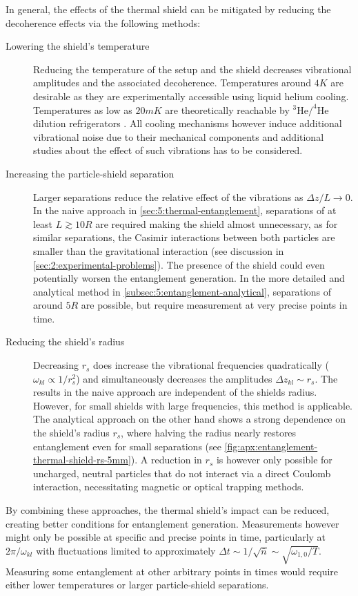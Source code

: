 In general, the effects of the thermal shield can be mitigated by reducing the decoherence effects via the following methods:
\begin{description}
  \item[Lowering the shield's temperature] Reducing the temperature of the setup and the shield decreases vibrational amplitudes and the associated decoherence.
  Temperatures around $4\si{K}$ are desirable as they are experimentally accessible using liquid helium cooling. Temperatures as low as $20\si{mK}$ are theoretically reachable by $^3\mathrm{He}/^4\mathrm{He}$ dilution refrigerators \cite{Das_1965, Zu_2022}. All cooling mechanisms however induce additional vibrational noise due to their mechanical components and additional studies about the effect of such vibrations has to be considered.

  \item[Increasing the particle-shield separation] Larger separations reduce the relative effect of the vibrations as $\Delta z / L \rightarrow 0$. In the naive approach in \cref{sec:5:thermal-entanglement}, separations of at least $L \gtrsim 10 R$ are required making the shield almost unnecessary, as for similar separations, the Casimir interactions between both particles are smaller than the gravitational interaction (see discussion in \cref{sec:2:experimental-problems}). The presence of the shield could even potentially worsen the entanglement generation. In the more detailed and analytical method in \cref{subsec:5:entanglement-analytical}, separations of around $5R$ are possible, but require measurement at very precise points in time.
  
  \item[Reducing the shield's radius] Decreasing $r_s$ does increase the vibrational frequencies quadratically ($\omega_{kl} \propto 1/r_s^2$) and simultaneously decreases the amplitudes $\Delta z_{kl} \sim r_s$. The results in the naive approach are independent of the shields radius. However, for small shields with large frequencies, this method is applicable. The analytical approach on the other hand shows a strong dependence on the shield's radius $r_s$, where halving the radius nearly restores entanglement even for small separations (see \cref{fig:apx:entanglement-thermal-shield-rs-5mm}). A reduction in $r_s$ is however only possible for uncharged, neutral particles that do not interact via a direct Coulomb interaction, necessitating magnetic or optical trapping methods.
\end{description}
By combining these approaches, the thermal shield's impact can be reduced, creating better conditions for entanglement generation. Measurements however might only be possible at specific and precise points in time, particularly at $2\pi/\omega_{kl}$ with fluctuations limited to approximately $\Delta t \sim 1/\sqrt{\bar{n}} \sim \sqrt{\omega_{1,0} / T}$.
Measuring some entanglement at other arbitrary points in times would require either lower temperatures or larger particle-shield separations.

